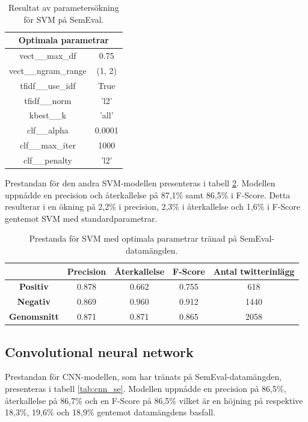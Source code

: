\documentclass{kaumasters} %
\begin{document}
\begin{table}[H]
\centering
\caption{Resultat av parametersökning för SVM på SemEval.}
\label{tab:svm_grid_se}
    \begin{tabular}{cc}
    \toprule
    \multicolumn{2}{c}{\textbf{Optimala parametrar}} \\
    \midrule
    vect\_\_max\_df & 0.75  \\
    vect\_\_ngram\_range & (1, 2)  \\
    tfidf\_\_use\_idf & True  \\
    tfidf\_\_norm & 'l2'  \\
    kbest\_\_k & 'all' \\
    clf\_\_alpha & 0.0001 \\
    clf\_\_max\_iter & 1000 \\
    clf\_\_penalty & 'l2' \\
    \bottomrule
\end{tabular}
\end{table}

Prestandan för den andra SVM-modellen presenteras i tabell \ref{tab:svm_imp_se}. Modellen uppnådde en precision och återkallelse på 87,1\% samt 86,5\% i F-Score. Detta resulterar i en ökning på 2,2\% i precision, 2,3\% i återkallelse och 1,6\% i F-Score gentemot SVM med standardparametrar.

\begin{table}[H]
\centering
\caption{Prestanda för SVM med optimala parametrar tränad på SemEval-datamängden.}
\label{tab:svm_imp_se}
    \begin{tabular}{ccccc}
    \toprule
     & \textbf{Precision} & \textbf{Återkallelse} & \textbf{F-Score} & \textbf{Antal twitterinlägg}  \\
    \midrule
    \textbf{Positiv} & 0.878 & 0.662 & 0.755 & 618 \\
    \textbf{Negativ} & 0.869 & 0.960 & 0.912 & 1440 \\
    \midrule
    \textbf{Genomsnitt} & 0.871 & 0.871 & 0.865  & 2058 \\
    \bottomrule
\end{tabular}
\end{table}

\subsection{Convolutional neural network}
Prestandan för CNN-modellen, som har tränats på SemEval-datamängden, presenteras i tabell \ref{tab:cnn_se}. Modellen uppnådde en precision på 86,5\%, återkallelse på 86,7\% och en F-Score på 86,5\% vilket är en höjning på respektive 18,3\%, 19,6\% och 18,9\% gentemot datamängdens basfall. 
\end{document}
